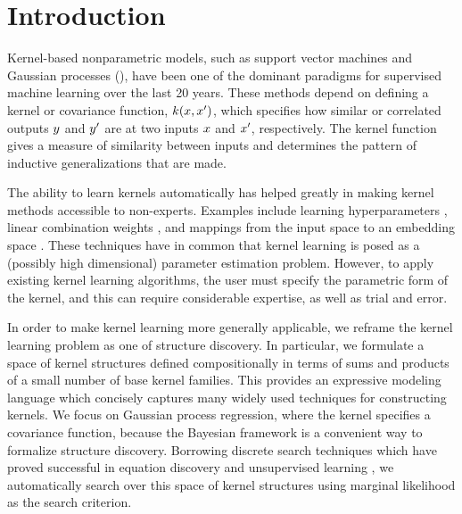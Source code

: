 \documentclass[twoside]{article}
\begin{document}
\section{Introduction}

Kernel-based nonparametric models, such as support vector machines and Gaussian processes (\gp{}), have been one of the dominant paradigms for supervised machine learning over the last 20 years.
These methods depend on defining a kernel or covariance function, $k(x,x')$, which specifies how similar or correlated outputs $y$ and $y'$ are at two inputs $x$ and $x'$, respectively.
The kernel function gives a measure of similarity between inputs and determines the pattern of inductive generalizations that are made. 

The ability to learn kernels automatically has helped greatly in making kernel methods accessible to non-experts.
Examples include learning hyperparameters , linear combination weights \cite{Back_HKL}, and mappings from the input space to an embedding space \cite{salakhutdinov2008using}.
These techniques have in common that kernel learning is posed as a (possibly high dimensional) parameter estimation problem.
However, to apply existing kernel learning algorithms, the user must specify the parametric form of the kernel, and this can require considerable expertise, as well as trial and error.

In order to make kernel learning more generally applicable, we reframe the kernel learning problem as one of structure discovery.
In particular, we formulate a space of kernel structures defined compositionally in terms of sums and products of a small number of base kernel families.
This provides an expressive modeling language which concisely captures many widely used techniques for constructing kernels.
We focus on Gaussian process regression, where the kernel specifies a covariance function, because the Bayesian framework is a convenient way to formalize structure discovery.
Borrowing discrete search techniques which have proved successful in equation discovery \cite{todorovski1997declarative} and unsupervised learning \cite{grosse2012exploiting}, we automatically search over this space of kernel structures using marginal likelihood as the search criterion.
\end{document}
